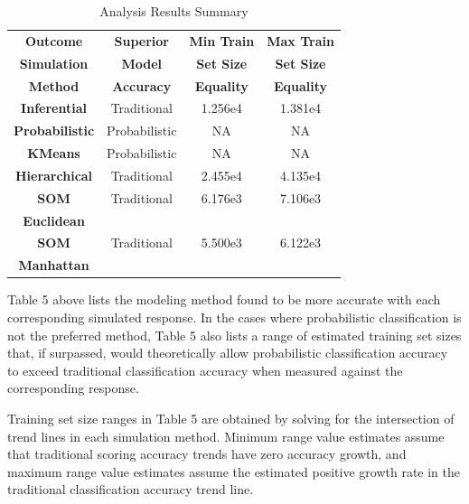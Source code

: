 \documentclass[12pt,]{article}
\begin{document}
\begin{table}[!h]
\begin{center}
\begin{tabular}{|c||c|c|c|}
\hline
\textbf{Outcome}       &  \textbf{Superior}     &  \textbf{Min Train}   &  \textbf{Max Train }\\
\textbf{Simulation}    &  \textbf{Model}        &  \textbf{Set Size }   &  \textbf{Set Size  }\\  
\textbf{Method}        &  \textbf{Accuracy}     &  \textbf{Equality }   &  \textbf{Equality  }\\  
\hline
\hline
\textbf{Inferential}   & Traditional   &  1.256e4     &  1.381e4    \\
\hline 
\textbf{Probabilistic} & Probabilistic &  NA          &  NA          \\
\hline
\textbf{KMeans}        & Probabilistic &  NA          &  NA          \\
\hline
\textbf{Hierarchical}  & Traditional   &  2.455e4     &  4.135e4     \\
\hline
\textbf{SOM}           & Traditional   &  6.176e3     &  7.106e3     \\
\textbf{Euclidean}     &               &              &              \\
\hline
\textbf{SOM}           & Traditional   &  5.500e3     &  6.122e3     \\
\textbf{Manhattan}     &               &              &              \\
\hline
\end{tabular}
\end{center}
\caption{Analysis Results Summary}
\end{table}

Table 5 above lists the modeling method found to be more accurate with
each corresponding simulated response. In the cases where probabilistic
classification is not the preferred method, Table 5 also lists a range
of estimated training set sizes that, if surpassed, would theoretically
allow probabilistic classification accuracy to exceed traditional
classification accuracy when measured against the corresponding
response.

Training set size ranges in Table 5 are obtained by solving for the
intersection of trend lines in each simulation method. Minimum range
value estimates assume that traditional scoring accuracy trends have
zero accuracy growth, and maximum range value estimates assume the
estimated positive growth rate in the traditional classification
accuracy trend line.
\end{document}
